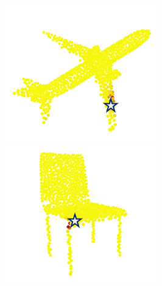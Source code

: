 \documentclass[letterpaper]{article}
\begin{document}
\begin{figure}[htbp]
\begin{center}
\begin{minipage}[b]{0.8\linewidth}
\begin{center}
\begin{minipage}[b]{0.12\linewidth}
\begin{center}
\end{center}
\end{minipage}
\begin{minipage}[b]{0.12\linewidth}
\begin{center}
\includegraphics[width=1.0\linewidth]{images/atten_pic/dgcnn_airplane_feature_3.png}
\end{center}
\end{minipage}
\begin{minipage}[b]{0.12\linewidth}
\begin{center}
\includegraphics[width=1.0\linewidth]{images/atten_pic/dgcnn_chair_feature_1.png}

\end{center}
\end{minipage}
\end{center}
\end{minipage}
\end{center}
\end{figure}
\end{document}
